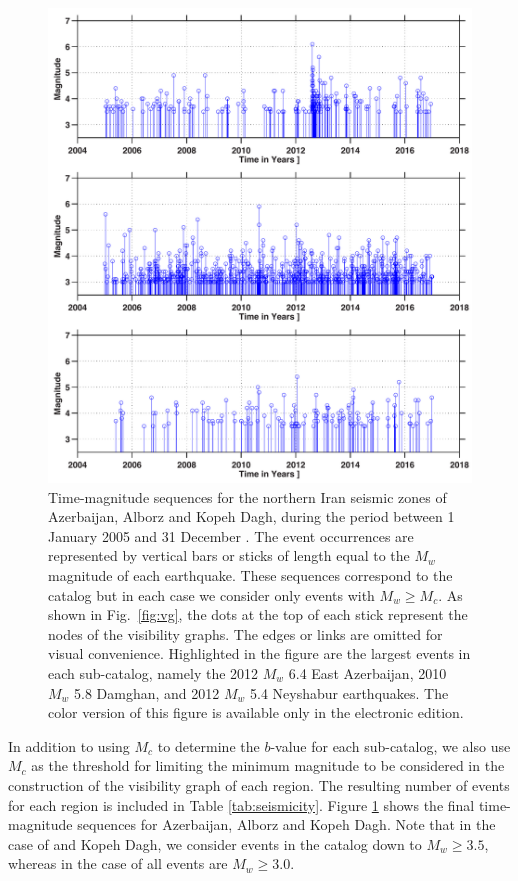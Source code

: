 \begin{figure}[t]
	\centering
	\includegraphics[width=\textwidth]{figures/pdf/figure-05-rev} 
	\caption{Time-magnitude sequences for the northern Iran seismic zones of Azerbaijan, Alborz and Kopeh Dagh, during the period between 1 January 2005 and 31 December . The event occurrences are represented by vertical bars or sticks of length equal to the $M_w$ magnitude of each earthquake. These sequences correspond to the  catalog but in each case we consider only events with $M_w \geq M_c$. As shown in Fig.~\ref{fig:vg}, the dots at the top of each stick represent the nodes of the visibility graphs. The edges or links are omitted for visual convenience. Highlighted in the figure are the largest events in each sub-catalog, namely the 2012 $M_w$ 6.4 East Azerbaijan, 2010 $M_w$ 5.8 Damghan, and 2012 $M_w$ 5.4 Neyshabur earthquakes. The color version of this figure is available only in the electronic edition.}
	\label{fig:mag-time}
\end{figure}

In addition to using $M_c$ to determine the $b$-value for each sub-catalog, we also use $M_c$ as the threshold for limiting the minimum magnitude to be considered in the construction of the visibility graph of each region. The resulting number of events for each region is included in Table \ref{tab:seismicity}. Figure \ref{fig:mag-time} shows the final time-magnitude sequences for Azerbaijan, Alborz and Kopeh Dagh. Note that in the case of  and Kopeh Dagh, we consider events in the  catalog down to $M_w \geq 3.5$, whereas in the case of  all events are $M_w \geq 3.0$.

